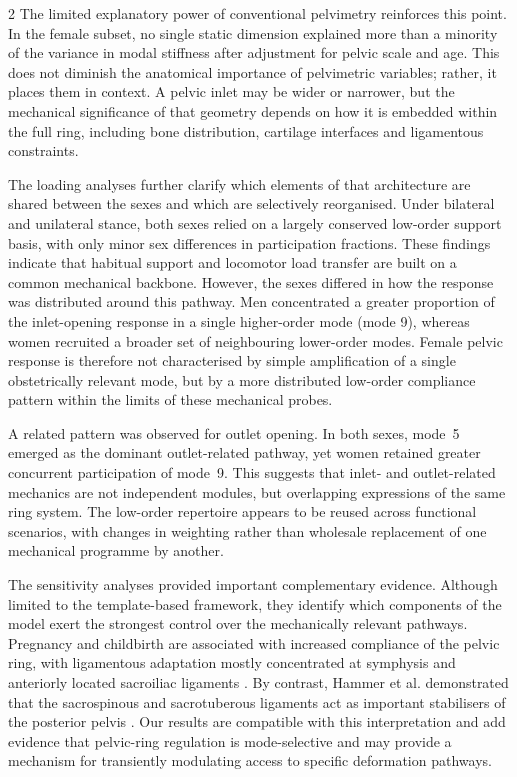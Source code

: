 \documentclass[openacc]{rsproca_new}
\begin{document}
\begin{multicols}{2}
The limited explanatory power of conventional pelvimetry reinforces this point. In the female subset, no single static dimension explained more than a minority of the variance in modal stiffness after adjustment for pelvic scale and age. This does not diminish the anatomical importance of pelvimetric variables; rather, it places them in context. A pelvic inlet may be wider or narrower, but the mechanical significance of that geometry depends on how it is embedded within the full ring, including bone distribution, cartilage interfaces and ligamentous constraints.

The loading analyses further clarify which elements of that architecture are shared between the sexes and which are selectively reorganised. Under bilateral and unilateral stance, both sexes relied on a largely conserved low-order support basis, with only minor sex differences in participation fractions. These findings indicate that habitual support and locomotor load transfer are built on a common mechanical backbone. However, the sexes differed in how the response was distributed around this pathway. Men concentrated a greater proportion of the inlet-opening response in a single higher-order mode (mode 9), whereas women recruited a broader set of neighbouring lower-order modes. Female pelvic response is therefore not characterised by simple amplification of a single obstetrically relevant mode, but by a more distributed low-order compliance pattern within the limits of these mechanical probes.

A related pattern was observed for outlet opening. In both sexes, mode~5 emerged as the dominant outlet-related pathway, yet women retained greater concurrent participation of mode~9. This suggests that inlet- and outlet-related mechanics are not independent modules, but overlapping expressions of the same ring system. The low-order repertoire appears to be reused across functional scenarios, with changes in weighting rather than wholesale replacement of one mechanical programme by another.

The sensitivity analyses provided important complementary evidence. Although limited to the template-based framework, they identify which components of the model exert the strongest control over the mechanically relevant pathways. Pregnancy and childbirth are associated with increased compliance of the pelvic ring, with ligamentous adaptation mostly concentrated at symphysis and anteriorly located sacroiliac ligaments \cite{Damen2001, Pires2015, Cicek2015, Fiani2021}. By contrast, Hammer et al. demonstrated that the sacrospinous and sacrotuberous ligaments act as important stabilisers of the posterior pelvis \cite{Hammer2019}. Our results are compatible with this interpretation and add evidence that pelvic-ring regulation is mode-selective and may provide a mechanism for transiently modulating access to specific deformation pathways.


\end{multicols}
\end{document}
